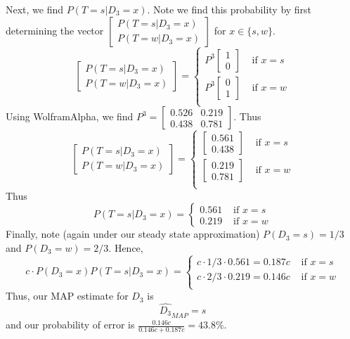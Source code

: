 \documentclass[paper=a4, fontsize=11pt]{scrartcl} %
\numberwithin{equation}{section} %
\numberwithin{figure}{section} %
\numberwithin{table}{section} %
\begin{document}
Next, we find $P(T = s | D_{3} = x)$. Note we find this probability by first determining the vector $\left[\begin{matrix} P(T = s | D_{3} = x) \\ P(T = w | D_{3} = x) \end{matrix} \right]$ for $x \in \{s, w\}$.
\[
\left[\begin{matrix} P(T = s | D_{3} = x) \\ P(T = w | D_{3} = x) \end{matrix} \right] =
\begin{cases}
P^3 \left[\begin{matrix}1 \\ 0 \end{matrix}\right] & \textrm{ if } x = s\\
P^3 \left[\begin{matrix}0 \\ 1 \end{matrix}\right] & \textrm{ if } x = w\\
\end{cases}
\]
Using WolframAlpha, we find $P^3 = \left[ \begin{matrix} 0.526 & 0.219 \\ 0.438 & 0.781 \end{matrix} \right]$. Thus
\[
\left[\begin{matrix} P(T = s | D_{3} = x) \\ P(T = w | D_{3} = x) \end{matrix} \right] =
\begin{cases}
\left[\begin{matrix} 0.561 \\ 0.438 \end{matrix}\right] & \textrm{ if } x = s\\
\left[\begin{matrix} 0.219 \\ 0.781 \end{matrix}\right] & \textrm{ if } x = w\\
\end{cases}
\]
Thus
\[
P(T = s | D_{3} = x) =
\begin{cases}
0.561 & \textrm{ if } x = s \\
0.219 & \textrm{ if } x = w
\end{cases}
\]
Finally,  note (again under our steady state approximation) $P(D_{3} = s) = 1/3$ and $ P(D_{3} = w) = 2/3$. Hence,
\[
 c \cdot P(D_{3} = x)P(T = s | D_{3} = x) = 
 \begin{cases}
 c \cdot 1/3 \cdot 0.561 = 0.187 c & \textrm{ if } x = s \\
 c \cdot 2/3 \cdot 0.219 = 0.146 c & \textrm{ if } x = w \\
\end{cases}
\]
Thus, our MAP estimate for $D_{3}$ is
\[\hat{D_{3}}_{MAP} = s\]
and our probability of error is $\frac{0.146 c}{0.146 c + 0.187 c} = 43.8\%$.
\end{document}
